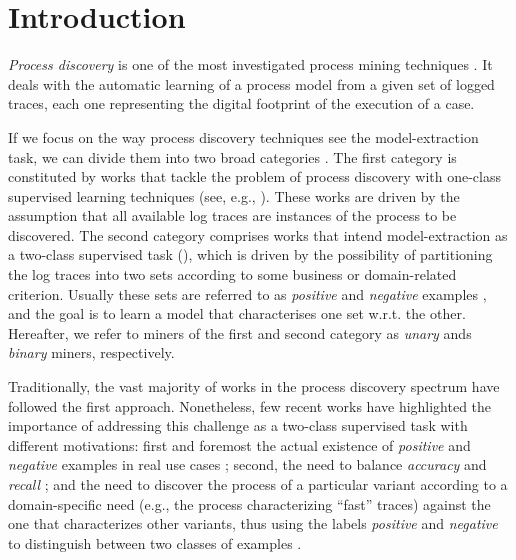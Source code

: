 

\section{Introduction}
\label{sec:introduction}

\emph{Process discovery} is one of the most investigated process mining techniques \cite{2012-Aalst}. It deals with the automatic learning of a process model from a given set of logged traces, each one representing the digital footprint of the execution of a case.

If we focus on the way process discovery techniques see the model-extraction task, we can divide them into two broad categories \cite{2018-Ponce,DBLP:conf/bpm/SlaatsDB21}. The first category is constituted by works that tackle the problem of process discovery with one-class supervised learning techniques (see, e.g., \cite{2010-Aalst,2004-Aalst,2007-Gunther,2003-Weijters}). These works are driven by the assumption that all available log traces are instances of the process to be discovered. The second category comprises works that intend model-extraction as a two-class supervised task (\cite{2009-Chesani,2009-Goedertier,2006-Maruster}), which is driven by the possibility of partitioning the log traces into two sets according to some business or domain-related criterion. Usually these sets are referred to as \emph{positive} and \emph{negative} examples \cite{2018-Ponce,DBLP:conf/bpm/SlaatsDB21}, and the goal is to learn a model that characterises one set w.r.t. the other. Hereafter, we refer to miners of the first and second category as \emph{unary} ands \emph{binary} miners, respectively. 

Traditionally, the vast majority of works in the process discovery spectrum have followed the first approach. Nonetheless, few recent works \cite{deviant-tkde,2018-Ponce,DBLP:conf/bpm/SlaatsDB21} have highlighted the importance of addressing this challenge as a two-class supervised task with different motivations: first and foremost the actual existence of \emph{positive} and \emph{negative} examples in real use cases \cite{2018-Ponce,DBLP:conf/bpm/SlaatsDB21}; second, the need to balance \emph{accuracy} and \emph{recall} \cite{DBLP:conf/bpm/SlaatsDB21}; and the need to discover the process of a particular variant according to a domain-specific need (e.g., the process characterizing ``fast'' traces) against the one that characterizes other variants, thus using the labels \emph{positive} and \emph{negative} to distinguish between two classes of examples \cite{deviant-arxiv}.  

